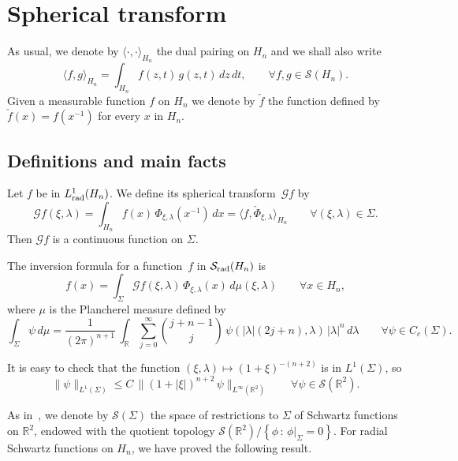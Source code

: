 \documentclass[12pt,a4paper]{amsart}
\theoremstyle{plain}
\theoremstyle{definition}
\numberwithin{equation}{section}
\begin{document}
\section{Spherical transform}
As usual, we denote by  ${\langle {\cdot},{\cdot} \rangle_{{H_{n}}}}$ the dual  pairing on 
 ${{H_{n}}}$ and we shall also write 
$$
{\langle {f},{g} \rangle_{{H_{n}}}}=\int_{{H_{n}}} f(z,t)\, g(z,t)\, dz\, dt,
  \qquad \forall f,g\in {\mathcal S}({{H_{n}}}).
$$
Given a measurable  function $f$ on ${{H_{n}}}$  we  
denote by $\check f$   the function defined by 
 $\check f(x)=f(x^{-1})$ for every $x$ in ${{H_{n}}}$.

\subsection{Definitions and main facts}
\label{defgel}
Let $f$ be in ${L^1_{\text{\rm rad}}({{H_{n}}})}$. We  define   its   spherical 
transform~${\mathcal G} f$     by  
$$
{\mathcal G} f(\xi,\lambda) =\int_{{H_{n}}} f(x)\, \Phi_{\xi,\lambda}(x^{-1})\, dx=
{\langle {f},{\check\Phi_{\xi,\lambda}} \rangle_{{H_{n}}}}
\qquad \forall (\xi,{\lambda})\in {\Sigma}.
$$
Then ${\mathcal G} f$ is a continuous function on ${\Sigma}$. 

 The inversion formula for a function~$f$ in ${{\mathcal S}_{\text{\rm rad}}({{H_{n}}})}$ is 
$$
f(x)=\int_{\Sigma} {\mathcal G} f(\xi,{\lambda})\, \Phi_{\xi,{\lambda}}(x)\, d\mu(\xi,{\lambda})
\qquad \forall x\in {{H_{n}}},
$$
where $\mu$ is the Plancherel measure defined by  
$$
\int_{\Sigma} \psi \, d\mu
=\frac{1}{(2\pi)^{{n}+1}}\,\int_{\mathbb R} 
  \sum_{j=0}^{\infty}\binom{j+ {n}-1}j\,
  \psi(|{\lambda}|(2j+ {n}),{\lambda})\, |{\lambda}|^{n}\, d{\lambda}
\qquad\forall \psi\in  
C_c({\Sigma}).
$$

It is easy to check that the function $(\xi,{\lambda})\mapsto (1+\xi)^{-({n}+2)}$
is in $L^1({\Sigma})$, so  
\begin{equation}
\label{integrabilita}
\| \psi \|_{L^1({\Sigma})}\leq C\,
\|(1+|\xi|)^{{n}+2}\,\psi \|_{L^\infty({\mathbb R}^2)}
\qquad \forall \psi\in {\mathcal S}({\mathbb R}^2).
\end{equation}

As in~\cite{ADR}, we denote by 
${\mathcal S}({\Sigma})$  the space of 
restrictions to ${\Sigma}$ of Schwartz functions on ${\mathbb R}^2$,
endowed with the quotient topology ${\mathcal S}({\mathbb R}^2)/{\left\{{\phi\, :\, \phi|_{\Sigma}=0}\right\}}$.
For  radial Schwartz functions  on ${{H_{n}}}$, we have proved
the following result.
 
\end{document}
